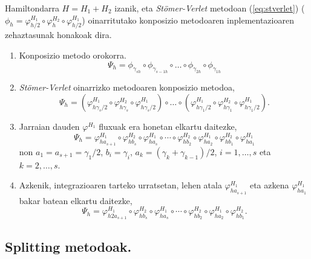Hamiltondarra $H=H_1+H_2$ izanik, eta \emph{Stömer-Verlet} metodoan (\ref{eq:stverlet}) ($\phi_h=\varphi_{h/2}^{H_1} \circ \varphi_{h}^{H_2} \circ \varphi_{h/2}^{H_1}$) oinarritutako konposizio metodoaren inplementazioaren zehaztasunak honakoak dira.
\begin{enumerate}
\item Konposizio metodo orokorra.
\begin{equation*}
\Psi_h =\phi_{\gamma_{s h}} \circ \phi_{\gamma_{s-1 h}} \circ \dots \circ \phi_{\gamma_{2 h}} \circ \phi_{\gamma_{1 h}}
\end{equation*}

\item \emph{Stömer-Verlet} oinarrizko metodoaren konposizio metodoa,
\begin{equation*}
\Psi_h =(\varphi_{h \gamma_s/2}^{H_1} \circ \varphi_{h \gamma_s}^{H_2} \circ \varphi_{h \gamma_s/2}^{H_1}) \circ \dots 
       \circ
       (\varphi_{h \gamma_1/2}^{H_1} \circ \varphi_{h \gamma_1}^{H_2} \circ \varphi_{h \gamma_1/2}^{H_1}).  
\end{equation*}

\item Jarraian dauden $\varphi^{H_1}$ fluxuak era honetan elkartu daitezke,
\begin{equation*}
\Psi_h=\varphi_{h a_{s+1}}^{H_1} \circ \varphi_{h b_s}^{H_2} \circ \varphi_{h a_s}^{H_1} \circ \cdots 
       \circ
       \varphi_{h b_2}^{H_2} 
       \circ
       \varphi_{h a_2}^{H_1} \circ \varphi_{h b_1}^{H_2} \circ \varphi_{h a_1}^{H_1}  
\end{equation*}
non $a_1=a_{s+1}=\gamma_1/2$, $b_i=\gamma_i$, $a_k=(\gamma_k+\gamma_{k-1})/2$, $i=1,\dots,s$ eta $k=2,\dots,s$.

\item Azkenik, integrazioaren tarteko urratsetan, lehen atala $\varphi_{h a_{s+1}}^{H_1}$ eta azkena $\varphi_{h a_1}^{H_1}$ bakar batean elkartu daitezke,
\begin{equation*}
\Psi_h=\varphi_{h 2 a_{s+1}}^{H_1} \circ \varphi_{h b_s}^{H_2} \circ \varphi_{h a_s}^{H_1} \circ \cdots 
\circ \varphi_{h b_2}^{H_2} 
\circ
\varphi_{h a_2}^{H_1} \circ \varphi_{h b_1}^{H_2}.
\end{equation*}

\end{enumerate}


\subsection{Splitting metodoak.}

